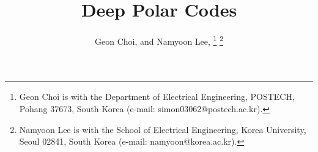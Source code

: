 \documentclass[conference]{IEEEtran}
\begin{document}

\title{Deep Polar Codes}


\author{   
Geon Choi,  and
 Namyoon Lee, 
\thanks{
Geon Choi is with the Department of Electrical Engineering, POSTECH, Pohang 37673, South Korea
(e-mail: \mbox{simon03062@postech.ac.kr}).
}
\thanks{
Namyoon Lee is with the School of Electrical Engineering, Korea University, Seoul 02841, South Korea (e-mail: \mbox{namyoon@korea.ac.kr}).
}
}

\maketitle
\end{document}
